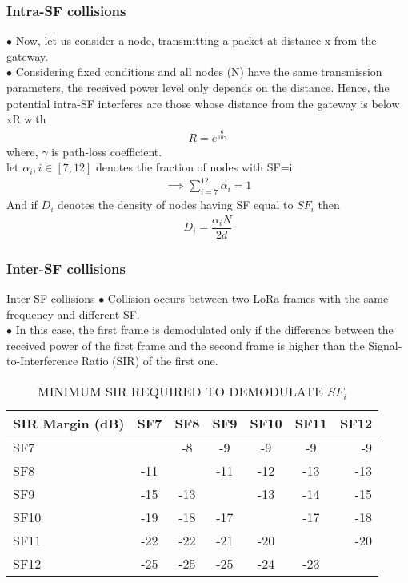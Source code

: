 \documentclass{beamer}
\begin{document}
\begin{frame}
\frametitle {Intra-SF collisions}
$\bullet$ Now, let us consider a node, transmitting a packet at distance x from the gateway.\\
$\bullet$ Considering fixed conditions and all nodes (N) have the same transmission parameters, the received power level only depends on the distance. Hence, the potential intra-SF interferes are those whose distance from the gateway is below xR with
\begin{align}
R=e^{\frac{6}{10\gamma}}
\end{align}
where, $\gamma$ is path-loss coefficient.\\
let $\alpha_i,i\in [7,12]$ denotes the fraction of nodes with SF=i.
\begin{align}
\implies \sum_{i=7}^{12} \alpha_i
=1\end{align}
And if $D_i$ denotes the density of nodes having SF equal to $SF_i$ then 
\begin{align}
D_i=\dfrac{\alpha_iN}{2d}
\end{align}
 
\end{frame}


\begin{frame}
\frametitle{Inter-SF collisions}
\begin{block}{Inter-SF collisions}
$\bullet$ Collision occurs between two LoRa frames with the same frequency and different SF.\\
$\bullet$ In this case, the first frame is demodulated only if the difference between the received power of the first frame and the second frame is higher than the Signal-to-Interference Ratio (SIR) of the first one. 

\end{block}
\begin{table}[h!]
  \begin{center}
    \caption{MINIMUM SIR REQUIRED TO DEMODULATE $SF_i$}
    \begin{tabular}{|l|c|c|c|c|c|r|}
    \hline 
     SIR Margin (dB) & SF7 & SF8 & SF9 & SF10 & SF11 & SF12\\
      \hline
      SF7 &  & -8 & -9 & -9 & -9 & -9\\
      \hline
      SF8 & -11 &  & -11 & -12 & -13 & -13\\
      \hline
      SF9 & -15 & -13 &  & -13 & -14 & -15\\
      \hline
      SF10 & -19 & -18 & -17 &  & -17 & -18\\
      \hline
      SF11 & -22 & -22 & -21 & -20 &  & -20\\
      \hline
      SF12 & -25 & -25 & -25 & -24 & -23 & \\
      \hline
    \end{tabular}
  \end{center}
\end{table}

\end{frame}
\end{document}
